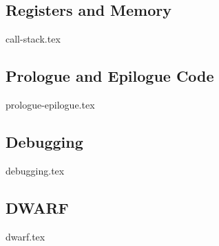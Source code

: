  

\subsection{Registers and Memory}
\label{sec:regmem}
{call-stack.tex}


\subsection{Prologue and Epilogue Code}
{prologue-epilogue.tex}


\subsection{Debugging}
{debugging.tex}


\subsection{DWARF}
\label{sec:dwarf}
{dwarf.tex}

